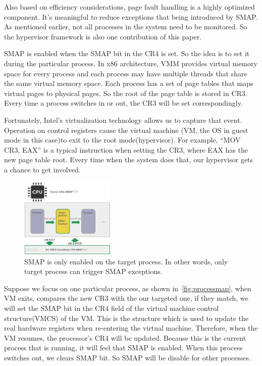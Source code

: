 Also based on efficiency considerations, page fault handling is a highly optimized component. It's meaningful to reduce exceptions that being introduced by SMAP. As mentioned earlier, not all processes in the system need to be monitored. So the hypervisor framework is also one contribution of this paper. 

SMAP is enabled when the SMAP bit in the CR4 is set. So the idea is to set it during the particular process. In x86 architecture, VMM provides virtual memory space for every process and each process may have multiple threads that share the same virtual memory space. Each process has a set of page tables that maps virtual pages to physical pages. So the root of the page table is stored in CR3. Every time a process switches in or out, the CR3 will be set correspondingly.

Fortunately, Intel's virtualization technology allows us to capture that event. Operation on control registers cause the virtual machine (VM, the OS in guest mode in this case)to exit to the root mode(hypervisor). For example, ``MOV CR3, EAX'' is a typical instruction when setting the CR3, where EAX has the new page table root. Every time when the system does that, our hypervisor gets a chance to get involved.

\begin{figure}[th]
  \includegraphics[width=0.40\textwidth]{figures/processmap}
  \centering
  \caption{SMAP is only enabled on the target process. In other words, only target process can trigger SMAP exceptions.}
  \label{fig:processmap}
\end{figure}

Suppose we focus on one particular process, as shown in~\autoref{fig:processmap}, when VM exits, compares the new CR3 with the our targeted one, if they match, we will set the SMAP bit in the CR4 field of the virtual machine control structure(VMCS) of the VM. This is the structure which is used to update the real hardware registers when re-entering the virtual machine. Therefore, when the VM resumes, the processor's CR4 will be updated. Because this is the current process that is running, it will feel that SMAP is enabled. When this process switches out, we clears SMAP bit. So SMAP will be disable for other processes.

